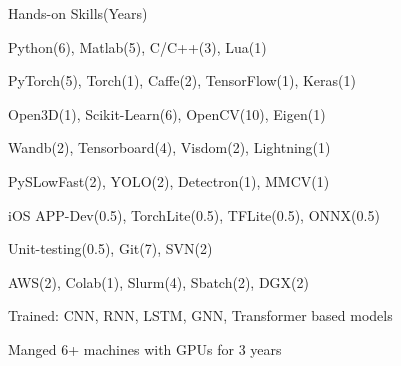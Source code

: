 \documentclass{resume} %
\begin{document}
\begin{paracol}{2}
\begin{rSection}{Hands-on Skills}{(Years)} 
  \begin{sSubsection}{Python(6), Matlab(5), C/C++(3), Lua(1)}\end{sSubsection}
  \begin{sSubsection}{PyTorch(5), Torch(1), Caffe(2), TensorFlow(1), Keras(1)}\end{sSubsection}
  \begin{sSubsection}{Open3D(1), Scikit-Learn(6), OpenCV(10), Eigen(1)}\end{sSubsection}
  \begin{sSubsection}{Wandb(2), Tensorboard(4), Visdom(2), Lightning(1)}\end{sSubsection}
  \begin{sSubsection}{PySLowFast(2), YOLO(2), Detectron(1), MMCV(1)}\end{sSubsection}
  \begin{sSubsection}{iOS APP-Dev(0.5), TorchLite(0.5), TFLite(0.5), ONNX(0.5)}\end{sSubsection}
  \begin{sSubsection}{Unit-testing(0.5), Git(7), SVN(2)}\end{sSubsection} %
  \begin{sSubsection}{AWS(2), Colab(1), Slurm(4), Sbatch(2), DGX(2)}\end{sSubsection}
  \begin{sSubsection}{Trained: CNN, RNN, LSTM, GNN, Transformer based models}\end{sSubsection}
  \begin{sSubsection}{Manged 6+ machines with GPUs for 3 years }\end{sSubsection}
\end{rSection}

\end{paracol}
\end{document}
